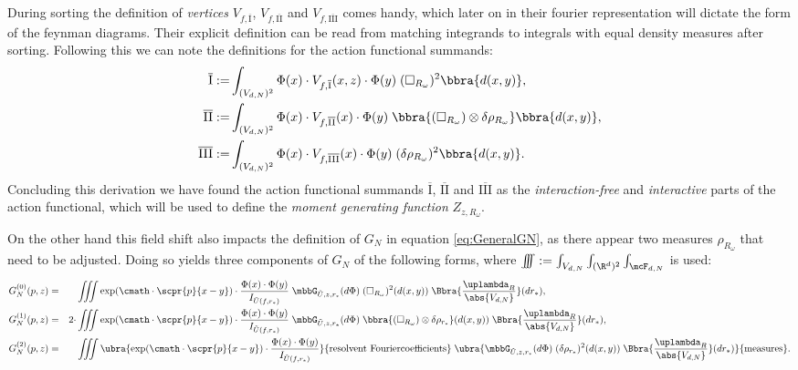 During sorting the definition of \emph{vertices} $V_{f,\overline{\text{I}}}$, $V_{f,\overline{\text{II}}}$ and $V_{f,\overline{\text{III}}}$ comes handy, which later on in their fourier representation will dictate the form of the feynman diagrams. Their explicit definition can be read from matching integrands to integrals with equal density measures after sorting. Following this we can note the definitions for the action functional summands:
\begin{align}
    \overline{\text{I}}:=&\int_{(V_{d,N})^2}\Phi(x)\cdot V_{f,\overline{\text{I}}}(x,z)\cdot\Phi(y)\;(\square_{R_\omega})^2\bbra{d(x,y)}, \label{def:oI} \\
    \overline{\text{II}}:=&\int_{(V_{d,N})^2}\Phi(x)\cdot V_{f,\overline{\text{II}}}(x)\cdot\Phi(y)\;\bbra{(\square_{R_\omega})\otimes\delta\rho_{R_\omega}}\bbra{d(x,y)},\label{def:oII} \\
    \overline{\text{III}}:=&\int_{(V_{d,N})^2}\Phi(x)\cdot V_{f,\overline{\text{III}}}(x)\cdot\Phi(y)\;(\delta\rho_{R_\omega})^2\bbra{d(x,y)}. \label{def:oIII}
\end{align}
Concluding this derivation we have found the action functional summands $\overline{\text{I}}$, $\overline{\text{II}}$ and $\overline{\text{III}}$ as the \emph{interaction-free} and \emph{interactive} parts of the action functional, which will be used to define the \emph{moment generating function} $Z_{z,R_\omega}$.

On the other hand this field shift also impacts the definition of $G_N$ in equation \eqref{eq:GeneralGN}, as there appear two measures $\rho_{R_\omega}$ that need to be adjusted. Doing so yields three components of $G_N$ of the following forms, where $\iiint := \int_{V_{d,N}}\int_{(\R^d)^2}\int_{\mcF_{d,N}}$ is used:
\begin{align*}
    G_N^{(0)}(p,z) &=& &\iiint\exp(\cmath\cdot\scpr{p}{x - y})\cdot\frac{\Phi(x)\cdot\Phi(y)}{I_{\tilde U(f,r_*)}}\;\mbbG_{\tilde U,z,r_*}(d\Phi)\;(\square_{R_\omega})^2(d(x,y))\;\Bbra{\frac{\uplambda_R}{\abs{V_{d,N}}}}(dr_*), \\
    G_N^{(1)}(p,z) &=& 2\cdot &\iiint\exp(\cmath\cdot\scpr{p}{x - y})\cdot\frac{\Phi(x)\cdot\Phi(y)}{I_{\tilde U(f,r_*)}}\;\mbbG_{\tilde U,z,r_*}(d\Phi)\;\bbra{(\square_{R_\omega})\otimes \delta\rho_{r_*}}(d(x,y))\;\Bbra{\frac{\uplambda_R}{\abs{V_{d,N}}}}(dr_*), \\
    G_N^{(2)}(p,z) &=& &\iiint\ubra{\exp(\cmath\cdot\scpr{p}{x - y})\cdot\frac{\Phi(x)\cdot\Phi(y)}{I_{\tilde U(f,r_*)}}}{\text{resolvent Fouriercoefficients}}\;\ubra{\mbbG_{\tilde U,z,r_*}(d\Phi)\;(\delta\rho_{r_*})^2(d(x,y))\;\Bbra{\frac{\uplambda_R}{\abs{V_{d,N}}}}(dr_*)}{\text{measures}}.
\end{align*} 
